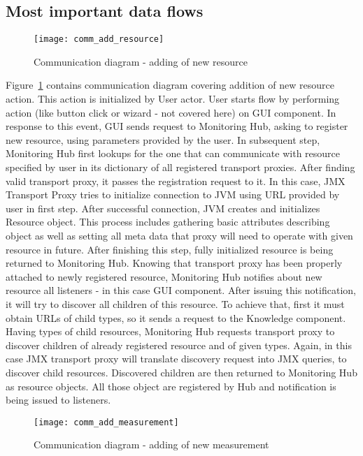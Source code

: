 \subsection{Most important data flows}

\begin{figure}[ht]
\centering
\texttt{[image: comm\_add\_resource]}
\caption{Communication diagram - adding of new resource}
\label{fig:comm_add_resource}
\end{figure}

Figure~\ref{fig:comm_add_resource} contains communication diagram covering addition of new resource action. This action is initialized by User actor. User starts flow by performing action (like button click or wizard - not covered here) on GUI component. In response to this event, GUI sends request to Monitoring Hub, asking to register new resource, using parameters provided by the user. In subsequent step, Monitoring Hub first lookups for the one that can communicate with resource specified by user in its dictionary of all registered transport proxies. After finding valid transport proxy, it passes the registration request to it. In this case, JMX Transport Proxy tries to initialize connection to JVM using URL provided by user in first step. After successful connection, JVM creates and initializes Resource object. This process includes gathering basic attributes describing object as well as setting all meta data that proxy will need to operate with given resource in future. After finishing this step, fully initialized resource is being returned to Monitoring Hub. Knowing that transport proxy has been properly attached to newly registered resource, Monitoring Hub notifies about new resource all listeners - in this case GUI component. After issuing this notification, it will try to discover all children of this resource. To achieve that, first it must obtain URLs of child types, so it sends a request to the Knowledge component. Having types of child resources, Monitoring Hub requests transport proxy to discover children of already registered resource and of given types. Again, in this case JMX transport proxy will translate discovery request into JMX queries, to discover child resources. Discovered children are then returned to Monitoring Hub as resource objects. All those object are registered by Hub and notification is being issued to listeners.

\begin{figure}[ht]
\centering
\texttt{[image: comm\_add\_measurement]}
\caption{Communication diagram - adding of new measurement}
\label{fig:comm_add_measurement}
\end{figure}

